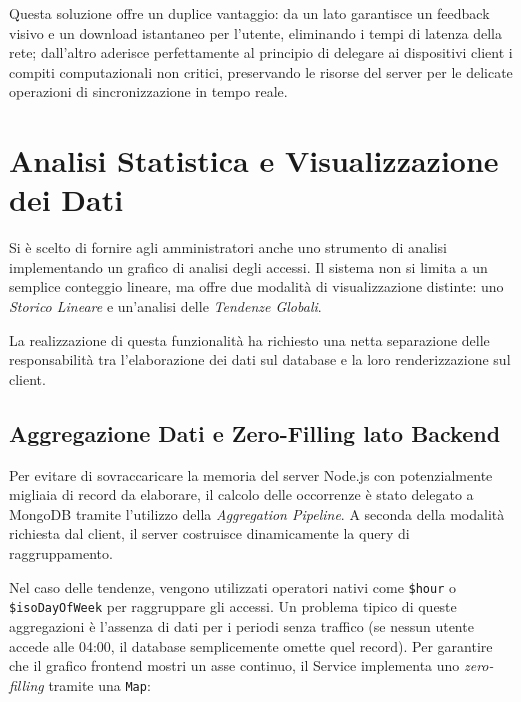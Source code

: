 \documentclass[11pt,a4paper]{report}
\begin{document}
Questa soluzione offre un duplice vantaggio: da un lato garantisce un feedback visivo e un download istantaneo per l'utente, eliminando i tempi di latenza della rete; dall'altro aderisce perfettamente al principio di delegare ai dispositivi client i compiti computazionali non critici, preservando le risorse del server per le delicate operazioni di sincronizzazione in tempo reale.

\section{Analisi Statistica e Visualizzazione dei Dati}
Si è scelto di fornire agli amministratori anche uno strumento di analisi implementando un grafico di analisi degli accessi. Il sistema non si limita a un semplice conteggio lineare, ma offre due modalità di visualizzazione distinte: uno \textit{Storico Lineare} e un'analisi delle \textit{Tendenze Globali}.

La realizzazione di questa funzionalità ha richiesto una netta separazione delle responsabilità tra l'elaborazione dei dati sul database e la loro renderizzazione sul client.

\subsection{Aggregazione Dati e Zero-Filling lato Backend}
Per evitare di sovraccaricare la memoria del server Node.js con potenzialmente migliaia di record da elaborare, il calcolo delle occorrenze è stato delegato a MongoDB tramite l'utilizzo della \textit{Aggregation Pipeline}. A seconda della modalità richiesta dal client, il server costruisce dinamicamente la query di raggruppamento.

Nel caso delle tendenze, vengono utilizzati operatori nativi come \texttt{\$hour} o \texttt{\$isoDayOfWeek} per raggruppare gli accessi. Un problema tipico di queste aggregazioni è l'assenza di dati per i periodi senza traffico (se nessun utente accede alle 04:00, il database semplicemente omette quel record). Per garantire che il grafico frontend mostri un asse continuo, il Service implementa uno \textit{zero-filling} tramite una \texttt{Map}:
\end{document}
